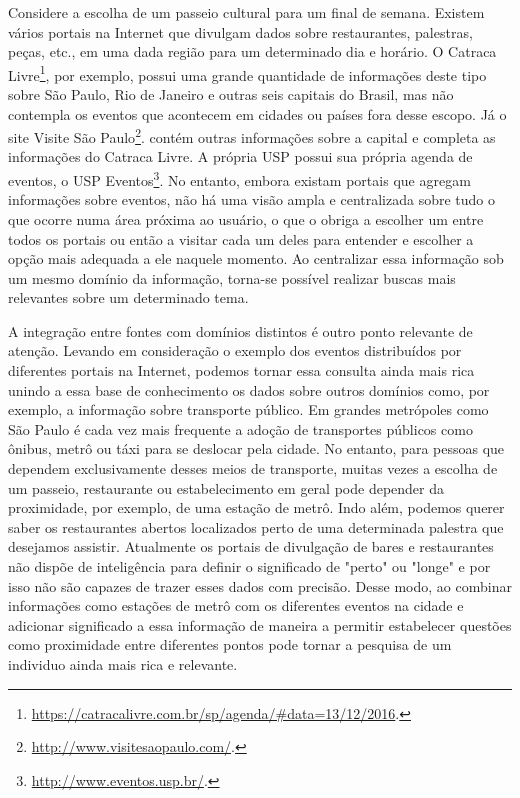 Considere a escolha de um passeio cultural para um final de semana. Existem vários portais na Internet que divulgam dados sobre restaurantes, palestras, peças, etc., em uma dada região para um determinado dia e horário. O Catraca Livre\footnote{\url{https://catracalivre.com.br/sp/agenda/\#data=13/12/2016}.}, por exemplo, possui uma grande quantidade de informações deste tipo sobre São Paulo, Rio de Janeiro e outras seis capitais do Brasil, mas não contempla os eventos que acontecem em cidades ou países fora desse escopo. Já o site Visite São Paulo\footnote{\url{http://www.visitesaopaulo.com/}.}. contém outras informações sobre a capital e completa as informações do Catraca Livre. A própria USP possui sua própria agenda de eventos, o USP Eventos\footnote{\url{http://www.eventos.usp.br/}.}. No entanto, embora existam portais que agregam informações sobre eventos, não há uma visão ampla e centralizada sobre tudo o que ocorre numa área próxima ao usuário, o que o obriga a escolher um entre todos os portais ou então a visitar cada um deles para entender e escolher a opção mais adequada a ele naquele momento. Ao centralizar essa informação sob um mesmo domínio da informação, torna-se possível realizar buscas mais relevantes sobre um determinado tema.

A integração entre fontes com domínios distintos é outro ponto relevante de atenção. Levando em consideração o exemplo dos eventos distribuídos por diferentes portais na Internet, podemos tornar essa consulta ainda mais rica unindo a essa base de conhecimento os dados sobre outros domínios como, por exemplo, a informação sobre transporte público. Em grandes metrópoles como São Paulo é cada vez mais frequente a adoção de transportes públicos como ônibus, metrô ou táxi para se deslocar pela cidade. No entanto, para pessoas que dependem exclusivamente desses meios de transporte, muitas vezes a escolha de um passeio, restaurante ou estabelecimento em geral pode depender da proximidade, por exemplo, de uma estação de metrô. Indo além, podemos querer saber os restaurantes abertos localizados perto de uma determinada palestra que desejamos assistir. Atualmente os portais de divulgação de bares e restaurantes não dispõe de inteligência para definir o significado de "perto" ou "longe" e por isso não são capazes de trazer esses dados com precisão. Desse modo, ao combinar informações como estações de metrô com os diferentes eventos na cidade e adicionar significado a essa informação de maneira a permitir estabelecer questões como proximidade entre diferentes pontos pode tornar a pesquisa de um individuo ainda mais rica e relevante.

